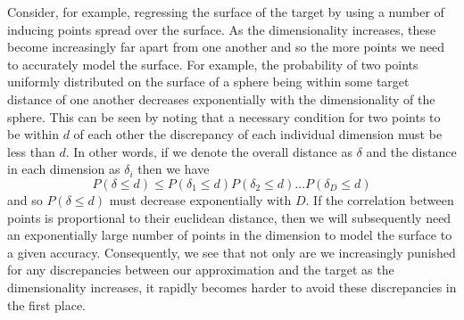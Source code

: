 Consider, for example,
regressing the surface of the target by using a number of inducing points spread over the
surface.  As the dimensionality increases, these become increasingly far apart from one
another and so the more points we need to accurately model the surface.  For example, the
probability of two points uniformly distributed on the surface of a sphere being within
some target distance of one another decreases exponentially
with the dimensionality of the sphere.  This can be seen by noting that a necessary condition
for two points to be within $d$ of each other the discrepancy of each individual dimension 
must be less than $d$.  In other words, if we denote the overall distance as $\delta$ and 
the distance in each dimension as $\delta_i$ then we have 
\[
P(\delta \le d)\le P(\delta_1 \le d)  P(\delta_2 \le d)  \dots  P(\delta_D \le d) 
\]
and so $P(\delta \le d)$ must decrease exponentially with $D$.  
If the correlation between points is proportional to their euclidean distance, then
we will subsequently need an exponentially large number of points in the dimension
to model the surface to a given accuracy.  Consequently, we see that not only are we
increasingly punished for any discrepancies between our approximation and the target
as the dimensionality increases, it rapidly becomes harder to avoid these discrepancies
in the first place.

